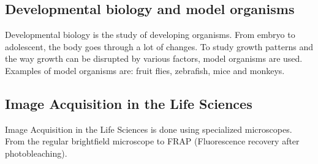 
\subsection{Developmental biology and model organisms}

Developmental biology is the study of
developing organisms. From embryo to
adolescent, the body goes through a lot of
changes. To study growth patterns and the way growth can be disrupted
by various factors, model organisms are
used. Examples of model organisms are: fruit flies, zebrafish, mice
and monkeys.


\subsection{Image Acquisition in the Life Sciences}

Image Acquisition in the Life Sciences is done using specialized
microscopes. From the regular brightfield microscope to FRAP (Fluorescence recovery after
photobleaching).

